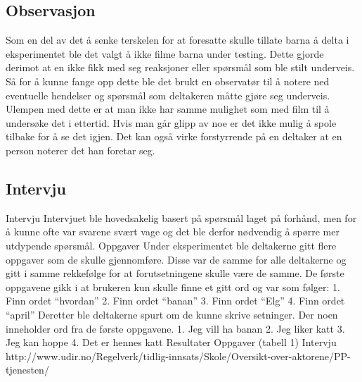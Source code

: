 \subsection{Observasjon}

Som en del av det å senke terskelen for at foresatte skulle tillate barna å delta i eksperimentet ble det valgt å ikke filme barna under testing. Dette gjorde derimot at en ikke fikk med seg reaksjoner eller spørsmål som ble stilt underveis. Så for å kunne fange opp dette ble det brukt en observatør til å notere ned eventuelle hendelser og spørsmål som deltakeren måtte gjøre seg underveis. Ulempen med dette er at man ikke har samme mulighet som med film til å undersøke det i ettertid. Hvis man går glipp av noe er det ikke mulig å spole tilbake for å se det igjen. Det kan også virke forstyrrende på en deltaker at en person noterer det han foretar seg. 


\subsection{Intervju}


Intervju
Intervjuet ble hovedsakelig basert på spørsmål laget på forhånd, men for å kunne ofte var svarene
svært vage og det ble derfor nødvendig å spørre mer utdypende spørsmål.
Oppgaver
Under eksperimentet ble deltakerne gitt flere oppgaver som de skulle gjennomføre. Disse var de
samme for alle deltakerne og gitt i samme rekkefølge for at forutsetningene skulle være de
samme.
De første oppgavene gikk i at brukeren kun skulle finne et gitt ord og var som følger:
1. Finn ordet “hvordan”
2. Finn ordet “banan”
3. Finn ordet “Elg”
4. Finn ordet “april”
Deretter ble deltakerne spurt om de kunne skrive setninger. Der noen inneholder ord fra de første
oppgavene.
1. Jeg vill ha banan
2. Jeg liker katt
3. Jeg kan hoppe
4. Det er hennes katt
Resultater
Oppgaver
(tabell 1)
Intervju
http://www.udir.no/Regelverk/tidlig-innsats/Skole/Oversikt-over-aktorene/PP-tjenesten/ 